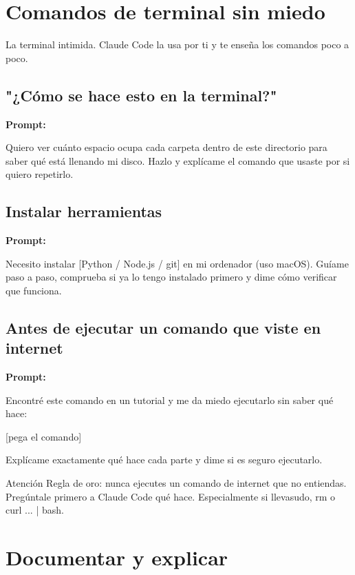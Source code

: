 \documentclass[11pt,a4paper]{report}
\begin{document}
\section{ Comandos de terminal sin miedo}

La terminal intimida. Claude Code la usa por ti y te enseña los comandos poco a poco.

\subsection{"¿Cómo se hace esto en la terminal?"}

\noindent\textbf{Prompt: }
\begin{codebox}
Quiero ver cuánto espacio ocupa cada carpeta dentro de este directorio para saber qué está llenando mi disco. Hazlo y explícame el comando que usaste por si quiero repetirlo.
\end{codebox}

\subsection{Instalar herramientas}

\noindent\textbf{Prompt: }
\begin{codebox}
Necesito instalar [Python / Node.js / git] en mi ordenador (uso macOS). Guíame paso a paso, comprueba si ya lo tengo instalado primero y dime cómo verificar que funciona.
\end{codebox}

\subsection{Antes de ejecutar un comando que viste en internet}

\noindent\textbf{Prompt: }
\begin{codebox}
Encontré este comando en un tutorial y me da miedo ejecutarlo sin saber qué hace:

[pega el comando]

Explícame exactamente qué hace cada parte y dime si es seguro ejecutarlo.
\end{codebox}

\begin{calloutbox}{Atención}
Regla de oro: nunca ejecutes un comando de internet que no entiendas. Pregúntale primero a Claude Code qué hace. Especialmente si llevasudo, rm o curl ... | bash.\end{calloutbox}

\section{ Documentar y explicar}
\end{document}
